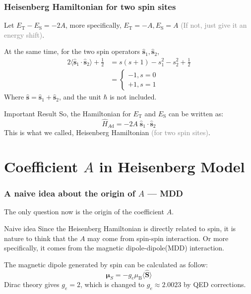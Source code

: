 \documentclass{beamer}
\begin{document}
  \begin{frame}
    \frametitle{Heisenberg Hamiltonian for two spin sites}
    Let \(E_\text{T} - E_\text{S} = -2A\), more specifically, \(E_\text{T} = -A, E_\text{S} = A\) \textcolor{gray}{(If not, just give it an energy shift)}.
    
    At the same time, for the two spin operators \(\widehat{\bm{s}}_1, \widehat{\bm{s}}_2\), 
    \begin{equation}
      \begin{aligned}
        2\langle\widehat{\bm{s}}_1\cdot\widehat{\bm{s}}_2\rangle + \frac{1}{2} &= s(s+1) - s_1^2 - s_2^2 + \frac{1}{2} \\
        &= \begin{cases}
          -1, s = 0\\
          +1, s = 1 
        \end{cases}
      \end{aligned}
    \end{equation}
    Where \(\widehat{\bm{s}} = \widehat{\bm{s}}_1+\widehat{\bm{s}}_2\), and the unit \(\hbar\) is not included.
    \begin{block}{Important Result}
      So, the Hamiltonian for \(E_\text{T}\) and \(E_\text{S}\) can be written as:
    \begin{equation}
      \widehat{H}_{A\text{d}} = -2A\;\widehat{\bm{s}}_1\cdot\widehat{\bm{s}}_2
    \end{equation}
    This is what we called, Heisenberg Hamiltonian \textcolor{gray}{(for two spin sites)}.
    \end{block}
  \end{frame}
  
  \section{Coefficient \(A\) in Heisenberg Model}

  \begin{frame}
    \frametitle{A naive idea about the origin of \(A\) --- MDD}
    The only question now is the origin of the coefficient \(A\).
    \begin{block}{Naive idea}
      Since the Heisenberg Hamiltonian is directly related to spin, it is nature to think that the \(A\) may come from spin-spin interaction. Or more specifically, it comes from the magnetic dipole-dipole(MDD) interaction.
    \end{block}
    The magnetic dipole generated by spin can be calculated as follow:
    \begin{equation}
      \bm{\mu}_S = -g_e\mu_{\text{B}}\langle\widehat{\bm{S}}\rangle
    \end{equation}
    Dirac theory gives \(g_e = 2\), which is changed to \(g_e\approx2.0023\) by QED corrections.
  \end{frame}
\end{document}
